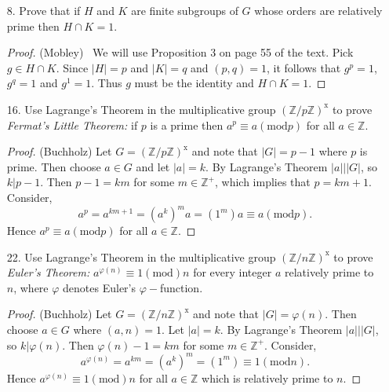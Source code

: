 \documentclass[10pt]{article}
\newcommand{\Z}{\mathbb{Z}}
\begin{document}
\begin{itemize}
\begin{proof}
\smallskip

(B)  $H$ is the only subgroup of order $n$.  But from the first part
$|H|=|gHg^{-1}|$ for an arbitrary $g\in G$.  Thus, $gHg^{-1}=H$ for
all $g \in G$ and $H \unlhd G$.
\end{proof}


\item[8.]  Prove that if $H$ and $K$ are finite subgroups of $G$ whose orders are relatively prime then $H\cap K=1$.

\begin{proof}(Mobley) \ We will use Proposition 3 on page 55 of the text.  Pick $g\in H\cap K$.  Since $|H|=p$ and $|K|=q$ and $(p,q)=1$, it follows that
$g^p=1$, $g^q=1$ and $g^1=1$.  Thus $g$ must be the identity and
$H\cap K=1$.
\end{proof}

\item[16.]  Use Lagrange's Theorem in the multiplicative group $(\Z/p\Z)^{\text{x}}$ to prove \textsl{Fermat's Little Theorem:} if $p$ is a prime then $a^p\equiv a(\text{mod}p)$ for all $a\in \Z$.

\begin{proof}(Buchholz)
Let $G=(\Z/p\Z)^{\text{x}}$ and note that $|G|=p-1$ where $p$ is
prime.  Then choose $a\in G$   and let $|a|=k$.  By Lagrange's
Theorem $|a|\big| |G|$, so $k | p-1$.  Then $p-1=km$ for some $m\in
\Z^{+}$, which implies that $p=km+1$.  Consider,
$$a^p=a^{km+1}=(a^k)^m a=(1^m)a\equiv a(\text{mod}p).$$
Hence $a^p\equiv a(\text{mod}p)$ for all $a\in \Z$.

\end{proof}

\item[22.]  Use Lagrange's Theorem in the multiplicative group $(\Z/n\Z)^{\text{x}}$ to prove \textsl{Euler's Theorem: }$a^{\varphi(n)}\equiv 1(\text{mod}) n$ for every integer $a$ relatively prime to $n$, where $\varphi$ denotes Euler's $\varphi-$function.

\begin{proof}(Buchholz)
Let $G=(\Z/n\Z)^{\text{x}}$ and note that $|G|=\varphi(n)$.  Then
choose $a\in G$ where $(a,n)=1$.  Let $|a|=k.$  By Lagrange's
Theorem $|a|\big| |G|$, so $k \big| \varphi(n)$.  Then
$\varphi(n)-1=km$ for some $m\in \Z^{+}$.  Consider,
$$a^{\varphi(n)}=a^{km}=(a^k)^m =(1^m)\equiv 1(\text{mod}n).$$
Hence $a^{\varphi(n)}\equiv 1(\text{mod}) n$ for all $a\in \Z$ which
is relatively prime to $n$.

\end{proof}

\end{itemize}
\end{document}

